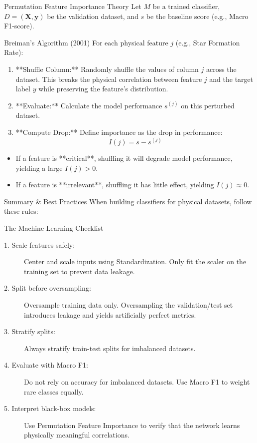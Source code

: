 \documentclass[9pt]{beamer}
\begin{document}
\begin{frame}{Permutation Feature Importance Theory}
  Let $M$ be a trained classifier, $D = (\mathbf{X}, \mathbf{y})$ be the validation dataset, and $s$ be the baseline score (e.g., Macro F1-score).
  \begin{block}{Breiman's Algorithm (2001)}
    For each physical feature $j$ (e.g., Star Formation Rate):
    \begin{enumerate}
      \item **Shuffle Column:** Randomly shuffle the values of column $j$ across the dataset. This breaks the physical correlation between feature $j$ and the target label $y$ while preserving the feature's distribution.
      \item **Evaluate:** Calculate the model performance $s^{(j)}$ on this perturbed dataset.
      \item **Compute Drop:** Define importance as the drop in performance:
        $$I(j) = s - s^{(j)}$$
    \end{enumerate}
  \end{block}
  \begin{itemize}
    \item If a feature is **critical**, shuffling it will degrade model performance, yielding a large $I(j) > 0$.
    \item If a feature is **irrelevant**, shuffling it has little effect, yielding $I(j) \approx 0$.
  \end{itemize}
\end{frame}

\begin{frame}{Summary \& Best Practices}
  When building classifiers for physical datasets, follow these rules:
  \begin{block}{The Machine Learning Checklist}
    \begin{description}
      \item[1. Scale features safely:] Center and scale inputs using Standardization. Only fit the scaler on the training set to prevent data leakage.
      \item[2. Split before oversampling:] Oversample training data only. Oversampling the validation/test set introduces leakage and yields artificially perfect metrics.
      \item[3. Stratify splits:] Always stratify train-test splits for imbalanced datasets.
      \item[4. Evaluate with Macro F1:] Do not rely on accuracy for imbalanced datasets. Use Macro F1 to weight rare classes equally.
      \item[5. Interpret black-box models:] Use Permutation Feature Importance to verify that the network learns physically meaningful correlations.
    \end{description}
  \end{block}
\end{frame}
\end{document}
